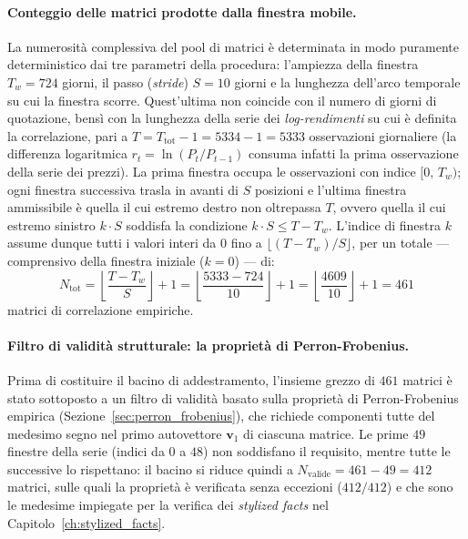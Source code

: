 \paragraph{Conteggio delle matrici prodotte dalla finestra mobile.} La numerosità complessiva del pool di matrici è determinata in modo puramente deterministico dai tre parametri della procedura: l'ampiezza della finestra $T_w = 724$ giorni, il passo (\emph{stride}) $S = 10$ giorni e la lunghezza dell'arco temporale su cui la finestra scorre. Quest'ultima non coincide con il numero di giorni di quotazione, bensì con la lunghezza della serie dei \emph{log-rendimenti} su cui è definita la correlazione, pari a $T = T_{\text{tot}} - 1 = 5334 - 1 = 5333$ osservazioni giornaliere (la differenza logaritmica $r_t = \ln(P_t/P_{t-1})$ consuma infatti la prima osservazione della serie dei prezzi). La prima finestra occupa le osservazioni con indice $[0,\, T_w)$; ogni finestra successiva trasla in avanti di $S$ posizioni e l'ultima finestra ammissibile è quella il cui estremo destro non oltrepassa $T$, ovvero quella il cui estremo sinistro $k \cdot S$ soddisfa la condizione $k \cdot S \le T - T_w$. L'indice di finestra $k$ assume dunque tutti i valori interi da $0$ fino a $\lfloor (T - T_w)/S \rfloor$, per un totale --- comprensivo della finestra iniziale ($k=0$) --- di:
\begin{equation}
N_{\text{tot}} = \left\lfloor \frac{T - T_w}{S} \right\rfloor + 1 = \left\lfloor \frac{5333 - 724}{10} \right\rfloor + 1 = \left\lfloor \frac{4609}{10} \right\rfloor + 1 = 461
\end{equation}
matrici di correlazione empiriche.

\paragraph{Filtro di validità strutturale: la proprietà di Perron-Frobenius.} Prima di costituire il bacino di addestramento, l'insieme grezzo di $461$ matrici è stato sottoposto a un filtro di validità basato sulla proprietà di Perron-Frobenius empirica (Sezione~\ref{sec:perron_frobenius}), che richiede componenti tutte del medesimo segno nel primo autovettore $\mathbf{v}_1$ di ciascuna matrice. Le prime $49$ finestre della serie (indici da $0$ a $48$) non soddisfano il requisito, mentre tutte le successive lo rispettano: il bacino si riduce quindi a $N_{\text{valide}} = 461 - 49 = 412$ matrici, sulle quali la proprietà è verificata senza eccezioni ($412/412$) e che sono le medesime impiegate per la verifica dei \emph{stylized facts} nel Capitolo~\ref{ch:stylized_facts}.

